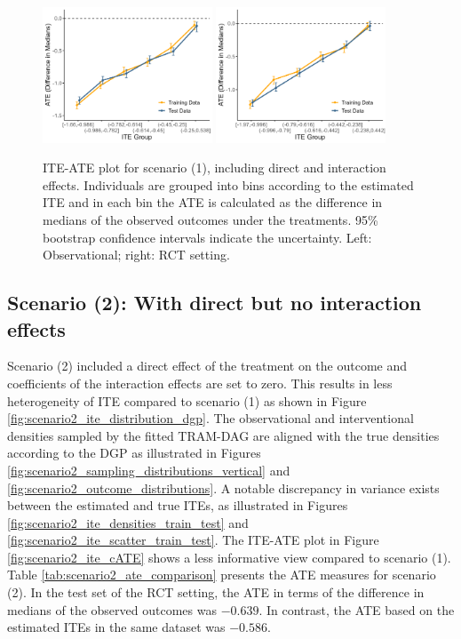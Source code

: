 \begin{figure}[htbp]
\centering
\includegraphics[width=0.45\textwidth]{img/results/observ_scenario1_ITE_cATE.png}
\includegraphics[width=0.45\textwidth]{img/results/rct_scenario1_ITE_cATE.png}
\caption{ITE-ATE plot for scenario (1), including direct and interaction effects. Individuals are grouped into bins according to the estimated ITE and in each bin the ATE is calculated as the difference in medians of the observed outcomes under the treatments. 95\% bootstrap confidence intervals indicate the uncertainty. Left: Observational; right: RCT setting.}
\label{fig:scenario1_ite_cATE}
\end{figure}



\clearpage


\subsection{Scenario (2): With direct but no interaction effects}

Scenario (2) included a direct effect of the treatment on the outcome and coefficients of the interaction effects are set to zero. This results in less heterogeneity of ITE compared to scenario (1) as shown in Figure \ref{fig:scenario2_ite_distribution_dgp}. The observational and interventional densities sampled by the fitted TRAM-DAG are aligned with the true densities according to the DGP as illustrated in Figures \ref{fig:scenario2_sampling_distributions_vertical} and \ref{fig:scenario2_outcome_distributions}. A notable discrepancy in variance exists between the estimated and true ITEs, as illustrated in Figures \ref{fig:scenario2_ite_densities_train_test} and \ref{fig:scenario2_ite_scatter_train_test}. The ITE-ATE plot in Figure \ref{fig:scenario2_ite_cATE} shows a less informative view compared to scenario (1). Table \ref{tab:scenario2_ate_comparison} presents the ATE measures for scenario (2). In the test set of the RCT setting, the ATE in terms of the difference in medians of the observed outcomes was $-0.639$. In contrast, the ATE based on the estimated ITEs in the same dataset was $-0.586$.


